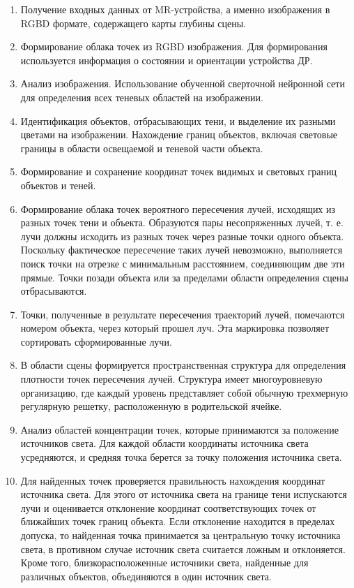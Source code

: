\begin{enumerate}
	\item Получение входных данных от MR-устройства, а именно изображения в RGBD формате, содержащего карты глубины сцены.
	\item Формирование облака точек из RGBD изображения. Для
	формирования используется информация о состоянии и ориентации устройства ДР.
	\item Анализ изображения. Использование обученной сверточной нейронной сети для определения всех теневых областей на изображении.
	\item Идентификация объектов, отбрасывающих тени, и выделение их разными цветами на изображении. Нахождение границ объектов, включая световые границы в области освещаемой и теневой части объекта.
	\item Формирование и сохранение координат точек видимых и световых границ объектов и теней. 
	\item Формирование облака точек вероятного пересечения лучей, исходящих из разных точек тени и объекта. Образуются пары несопряженных лучей, т. е. лучи должны исходить из разных точек через разные точки одного объекта. Поскольку фактическое пересечение таких лучей невозможно, выполняется поиск точки на отрезке с минимальным расстоянием, соединяющим две эти прямые. Точки позади объекта или за пределами области определения сцены отбрасываются. 
	\item Точки, полученные в результате пересечения траекторий лучей, помечаются номером объекта, через который прошел луч. Эта маркировка позволяет сортировать сформированные лучи.
	\item В области сцены формируется пространственная структура для определения плотности точек пересечения лучей. Структура имеет многоуровневую организацию, где каждый уровень представляет собой обычную трехмерную регулярную решетку, расположенную в родительской ячейке.
	\item Анализ областей концентрации точек, которые принимаются за положение источников света. Для каждой области координаты источника света усредняются, и средняя точка берется за точку положения источника света.
	\item Для найденных точек проверяется правильность нахождения координат источника света. Для этого от источника света на границе тени испускаются лучи и оценивается отклонение координат соответствующих точек от ближайших точек границ объекта. Если отклонение находится в пределах допуска, то найденная точка принимается за центральную точку источника света, в противном случае источник света считается ложным и отклоняется. Кроме того, близкорасположенные источники света, найденные для различных объектов, объединяются в один источник света.
\end{enumerate}

